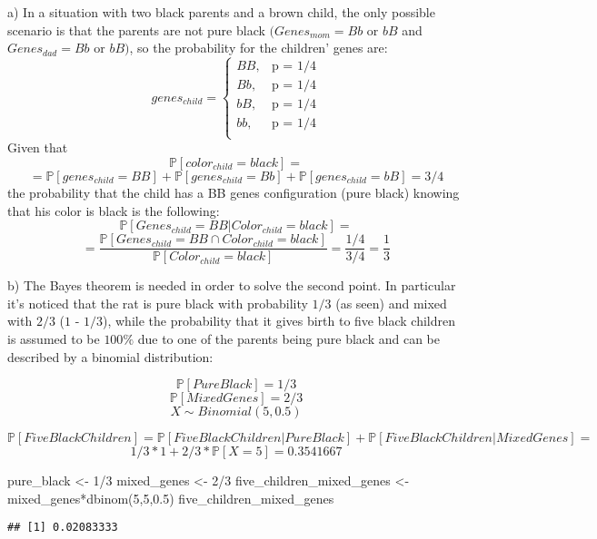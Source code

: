 \documentclass[
]{article}
\newenvironment{Shaded}{\begin{snugshade}}{\end{snugshade}}
\newcommand{\DecValTok}[1]{\textcolor[rgb]{0.00,0.00,0.81}{#1}}
\newcommand{\FloatTok}[1]{\textcolor[rgb]{0.00,0.00,0.81}{#1}}
\newcommand{\FunctionTok}[1]{\textcolor[rgb]{0.00,0.00,0.00}{#1}}
\newcommand{\NormalTok}[1]{#1}
\newcommand{\OtherTok}[1]{\textcolor[rgb]{0.56,0.35,0.01}{#1}}
\newcommand{\SpecialCharTok}[1]{\textcolor[rgb]{0.00,0.00,0.00}{#1}}
\begin{document}
a) In a situation with two black parents and a brown child, the only
possible scenario is that the parents are not pure black
\((Genes_{mom} = Bb\text{ or }bB\) and
\(Genes_{dad} = Bb\text{ or }bB)\), so the probability for the children'
genes are: \[
genes_{child} = \begin{cases} 
BB, & \mbox{p = 1/4}\\
Bb, & \mbox{p = 1/4}\\
bB, & \mbox{p = 1/4}\\
bb, & \mbox{p = 1/4}\\
\end{cases}\] Given that \[\mathbb P[color_{child}=black]=\]
\[=\mathbb P[genes_{child}=BB]+\mathbb P[genes_{child}=Bb]+\mathbb P[genes_{child}=bB]=3/4\]
the probability that the child has a BB genes configuration (pure black)
knowing that his color is black is the following: \[
\mathbb P[Genes_{child}=BB|Color_{child}=black]=\]
\[=\frac{\mathbb P[Genes_{child}=BB \cap Color_{child}=black]}{\mathbb P[Color_{child}=black]}=\frac{1/4}{3/4}=\frac{1}{3}
\]

b) The Bayes theorem is needed in order to solve the second point. In
particular it's noticed that the rat is pure black with probability
\(1/3\) (as seen) and mixed with \(2/3\) (\(1\) - \(1/3\)), while the
probability that it gives birth to five black children is assumed to be
\(100\%\) due to one of the parents being pure black and can be
described by a binomial distribution:

\[\mathbb P[PureBlack]=1/3\] \[\mathbb P[MixedGenes]=2/3\]
\[X \sim Binomial(5, 0.5)\]

\[\mathbb P[FiveBlackChildren]=\mathbb P[FiveBlackChildren|PureBlack]+\mathbb P[FiveBlackChildren|MixedGenes]=\]
\[1/3*1+2/3*\mathbb P[X=5]=0.3541667\]

\begin{Shaded}
\begin{Highlighting}[]
\NormalTok{pure\_black }\OtherTok{\textless{}{-}} \DecValTok{1}\SpecialCharTok{/}\DecValTok{3}
\NormalTok{mixed\_genes }\OtherTok{\textless{}{-}} \DecValTok{2}\SpecialCharTok{/}\DecValTok{3}
\NormalTok{five\_children\_mixed\_genes }\OtherTok{\textless{}{-}}\NormalTok{ mixed\_genes}\SpecialCharTok{*}\FunctionTok{dbinom}\NormalTok{(}\DecValTok{5}\NormalTok{,}\DecValTok{5}\NormalTok{,}\FloatTok{0.5}\NormalTok{)}
\NormalTok{five\_children\_mixed\_genes}
\end{Highlighting}
\end{Shaded}

\begin{verbatim}
## [1] 0.02083333
\end{verbatim}
\end{document}
